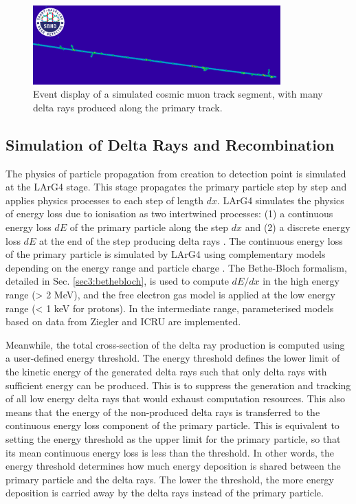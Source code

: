 \begin{figure}[bp!] 
\centering    
\includegraphics[width=0.85\textwidth]{delta_ray_evd}
\caption[delta_ray_evd]{
Event display of a simulated cosmic muon track segment, with many delta rays produced along the primary track.
}
\label{fig:delta_ray_evd}
\end{figure}


\subsection{Simulation of Delta Rays and Recombination}
\label{sec:simDeltaRay}

The physics of particle propagation from creation to detection point is simulated at the LArG4 stage.
This stage propagates the primary particle step by step and applies physics processes to each step of length $dx$.
LArG4 simulates the physics of energy loss due to ionisation as two intertwined processes: (1) a continuous energy loss $dE$ of the primary particle along the step $dx$ and (2) a discrete energy loss $dE$ at the end of the step producing delta rays \cite{geant4}.
The continuous energy loss of the primary particle is simulated by LArG4 using complementary models depending on the energy range and particle charge \cite{geant4_ions}.
The Bethe-Bloch formalism, detailed in Sec. \ref{sec3:bethebloch}, is used to compute $dE/dx$ in the high energy range (> 2 MeV), and the free electron gas model is applied at the low energy range (< 1 keV for protons).
In the intermediate range, parameterised models based on data from Ziegler \cite{Ziegler} and ICRU \cite{ICRU} are implemented.

Meanwhile, the total cross-section of the delta ray production is computed using a user-defined energy threshold.
The energy threshold defines the lower limit of the kinetic energy of the generated delta rays such that only delta rays with sufficient energy can be produced.
This is to suppress the generation and tracking of all low energy delta rays that would exhaust computation resources.
This also means that the energy of the non-produced delta rays is transferred to the continuous energy loss component of the primary particle.
This is equivalent to setting the energy threshold as the upper limit for the primary particle, so that its mean continuous energy loss is less than the threshold.
In other words, the energy threshold determines how much energy deposition is shared between the primary particle and the delta rays. 
The lower the threshold, the more energy deposition is carried away by the delta rays instead of the primary particle. 

